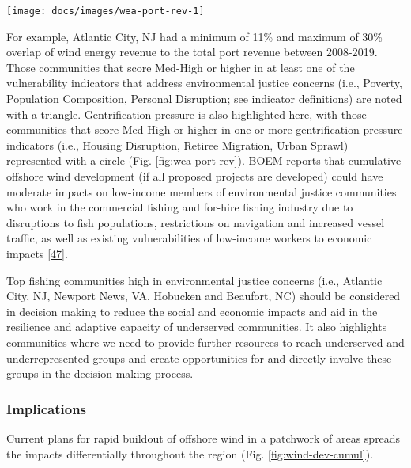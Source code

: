 \documentclass[
  10pt,
]{article}
\let\origfigure\figure
\let\endorigfigure\endfigure
\renewenvironment{figure}[1][2] {
    \expandafter\origfigure\expandafter[H]
} {
    \endorigfigure
}
\begin{document}
\begin{figure}

\texttt{[image: docs/images/wea-port-rev-1]} \hfill{}

\caption{Percent of port revenue from Wind Energy Areas (WEA) in descending order from most to least port revenue from WEA. EJ = Environmental Justice.}\label{fig:wea-port-rev}
\end{figure}

For example, Atlantic City, NJ had a minimum of 11\% and maximum of 30\%
overlap of wind energy revenue to the total port revenue between
2008-2019. Those communities that score Med-High or higher in at least
one of the vulnerability indicators that address environmental justice
concerns (i.e., Poverty, Population Composition, Personal Disruption;
see indicator definitions) are noted with a triangle. Gentrification
pressure is also highlighted here, with those communities that score
Med-High or higher in one or more gentrification pressure indicators
(i.e., Housing Disruption, Retiree Migration, Urban Sprawl) represented
with a circle (Fig. \ref{fig:wea-port-rev}). BOEM reports that
cumulative offshore wind development (if all proposed projects are
developed) could have moderate impacts on low-income members of
environmental justice communities who work in the commercial fishing and
for-hire fishing industry due to disruptions to fish populations,
restrictions on navigation and increased vessel traffic, as well as
existing vulnerabilities of low-income workers to economic impacts
{[}\protect\hyperlink{ref-boem_vineyard_2020}{47}{]}.

Top fishing communities high in environmental justice concerns (i.e.,
Atlantic City, NJ, Newport News, VA, Hobucken and Beaufort, NC) should
be considered in decision making to reduce the social and economic
impacts and aid in the resilience and adaptive capacity of underserved
communities. It also highlights communities where we need to provide
further resources to reach underserved and underrepresented groups and
create opportunities for and directly involve these groups in the
decision-making process.

\hypertarget{implications-7}{%
\subsubsection{Implications}\label{implications-7}}

Current plans for rapid buildout of offshore wind in a patchwork of
areas spreads the impacts differentially throughout the region (Fig.
\ref{fig:wind-dev-cumul}).
\end{document}
